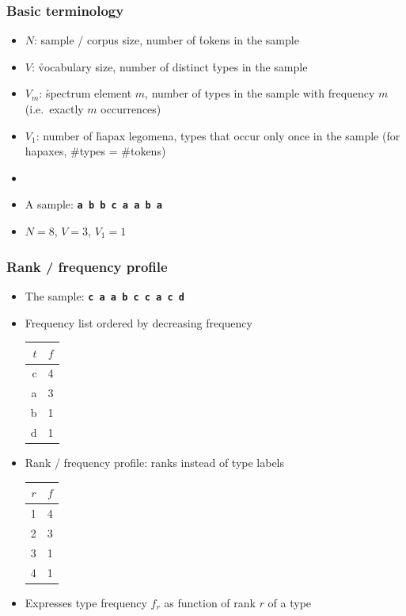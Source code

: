 \documentclass[t]{beamer} %
\begin{document}
\begin{frame}
 \frametitle{Basic terminology}

  \begin{itemize}
  \item $N$: sample / corpus size, number of \h{tokens} in the sample
  \item $V$: \h{vocabulary} size, number of distinct \h{types} in the sample
  \item $V_m$: \h{spectrum element} $m$, number of types in the sample with
    frequency $m$ (i.e.\ exactly $m$ occurrences)
  \item $V_1$: number of \h{hapax legomena}, types that occur only once in the
    sample (for hapaxes, \#types = \#tokens)
  \item[]
  \item A sample: \texttt{\textbf{a b b c a a b a}}
  \item $N = 8$, $V = 3$, $V_1 = 1$
  \end{itemize}
\end{frame}

\begin{frame}
\frametitle{Rank / frequency profile}

  \begin{itemize}
  \item The sample: \texttt{\textbf{c a a b c c a c d}}
  \item Frequency list ordered by decreasing frequency
    \begin{center}\small
      \begin{tabular}{r|r}
        $t$ & $f$\\
        \hline
        c & 4\\
        a & 3\\
        b & 1\\
        d & 1
      \end{tabular}
    \end{center}
    \pause
  \item Rank / frequency profile: ranks instead of type labels
    \begin{center}\small
      \begin{tabular}{r|r}
        $r$ & $f$\\
        \hline
        1 & 4\\
        2 & 3\\
        3 & 1\\
        4 & 1
      \end{tabular}
    \end{center}
  \item Expresses type frequency $f_r$ as function of rank $r$ of a type
  \end{itemize}

\end{frame}
\end{document}
